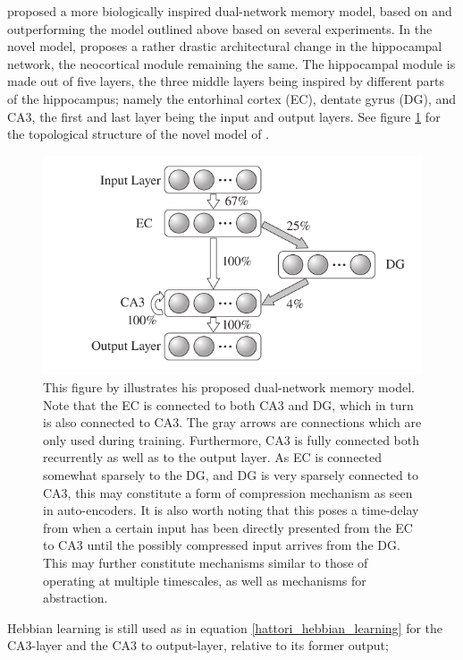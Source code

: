 \cite{Hattori2014} proposed a more biologically inspired dual-network memory model, based on and outperforming the model outlined above based on several experiments. In the novel model, \cite{Hattori2014} proposes a rather drastic architectural change in the hippocampal network, the neocortical module remaining the same. The hippocampal module is made out of five layers, the three middle layers being inspired by different parts of the hippocampus; namely the entorhinal cortex (EC), dentate gyrus (DG), and CA3, the first and last layer being the input and output layers. See figure \ref{fig:hattori_2014_model} for the topological structure of the novel model of \cite{Hattori2014}.

\begin{figure}
\centering
\includegraphics[width=12cm]{fig/hattori2014_hpc_module}
\caption{This figure by \cite{Hattori2014} illustrates his proposed dual-network memory model. Note that the EC is connected to both CA3 and DG, which in turn is also connected to CA3. The gray arrows are connections which are only used during training. Furthermore, CA3 is fully connected both recurrently as well as to the output layer. As EC is connected somewhat sparsely to the DG, and DG is very sparsely connected to CA3, this may constitute a form of compression mechanism as seen in auto-encoders. It is also worth noting that this poses a time-delay from when a certain input has been directly presented from the EC to CA3 until the possibly compressed input arrives from the DG. This may further constitute mechanisms similar to those of operating at multiple timescales, as well as mechanisms for abstraction.}
\label{fig:hattori_2014_model}
\end{figure}

Hebbian learning is still used as in equation \ref{hattori_hebbian_learning} for the CA3-layer and the CA3 to output-layer, relative to its former output;

